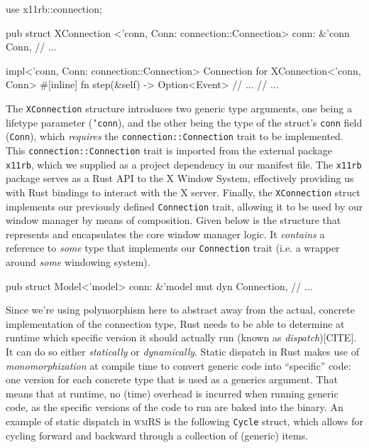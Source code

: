\begin{rustblock}
  use x11rb::connection;
 
  pub struct XConnection
    <'conn, Conn: connection::Connection>
  {
    conn: &'conn Conn,
    // ...
  }
 
  impl<'conn, Conn: connection::Connection>
    Connection for XConnection<'conn, Conn>
  {
    #[inline]
    fn step(&self) -> Option<Event> {
      // ...
    }
    // ...
  }
\end{rustblock}

The  \texttt{XConnection}  structure  introduces  two  generic  type  arguments,
one  being   a  lifetype  parameter   (\texttt{'conn}),  and  the   other  being
the   type  of   the   struct's  \texttt{conn}   field  (\texttt{Conn}),   which
\textit{requires} the  \texttt{connection::Connection} trait to  be implemented.
This \texttt{connection::Connection} trait is imported from the external package
\texttt{x11rb}, which we supplied as a  project dependency in our manifest file.
The  \texttt{x11rb}  package serves  as  a  Rust API  to  the  X Window  System,
effectively  providing us  with Rust  bindings to  interact with  the X  server.
Finally,  the  \texttt{XConnection}  struct implements  our  previously  defined
\texttt{Connection} trait, allowing it to be used by our window manager by means
of composition.  Given below is  the structure that represents  and encapsulates
the core window manager logic. It \textit{contains} a reference to \textit{some}
type  that  implements our  \texttt{Connection}  trait  (i.e. a  wrapper  around
\textit{some} windowing system).

\begin{rustblock}
  pub struct Model<'model> {
    conn: &'model mut dyn Connection,
    // ...
  }
\end{rustblock}


Since  we're  using  polymorphism  here   to  abstract  away  from  the  actual,
concrete  implementation  of  the  connection   type,  Rust  needs  to  be  able
to  determine  at  runtime  which   specific  version  it  should  actually  run
(known  as \textit{dispatch})[CITE].  It  can do  so either  \textit{statically}
or   \textit{dynamically}.    Static   dispatch    in   Rust   makes    use   of
\textit{monomorphization}  at   compile  time  to  convert   generic  code  into
``specific'' code: one version for each concrete type that is used as a generics
argument.  That means  that  at runtime,  no (time)  overhead  is incurred  when
running generic code, as the specific versions of the code to run are baked into
the binary.  An example  of static  dispatch in  \textsc{wmRS} is  the following
\texttt{Cycle} struct, which  allows for cycling forward and  backward through a
collection of (generic) items.

